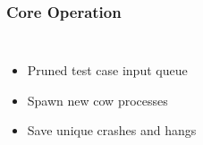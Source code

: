 \begin{frame}
\frametitle{Core Operation}

\begin{columns}[c]


\begin{itemize}
    \item Pruned test case input queue
    \item Spawn new cow processes
    \item Save unique crashes and hangs
\end{itemize}

\end{columns}
\end{frame}
